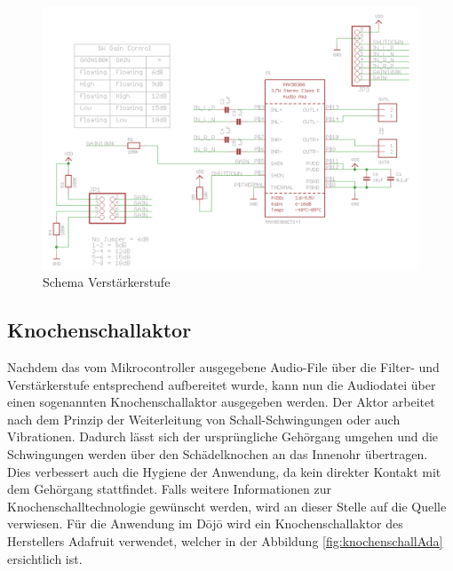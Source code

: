 \begin{figure}[H]
	\begin{center}
		\includegraphics[width=120mm]{data/Schema_Verstaerkerstufe.png}
		\caption{Schema Verstärkerstufe \cite{Verstaerker_Schema}} %
		\label{fig:Verstärkerstufe}
	\end{center}
\end{figure}


\subsection{Knochenschallaktor} \label{sec:knochenschallaktor}
Nachdem das vom Mikrocontroller ausgegebene Audio-File über die Filter- und Verstärkerstufe entsprechend aufbereitet wurde, kann nun die Audiodatei über einen sogenannten Knochenschallaktor ausgegeben werden. Der Aktor arbeitet nach dem Prinzip der Weiterleitung von Schall-Schwingungen oder auch Vibrationen. Dadurch lässt sich der ursprüngliche Gehörgang umgehen und die Schwingungen werden über den Schädelknochen an das Innenohr übertragen. Dies verbessert auch die Hygiene der Anwendung, da kein direkter Kontakt mit dem Gehörgang stattfindet\cite{Knochenschall}. Falls weitere Informationen zur Knochenschalltechnologie gewünscht werden, wird an dieser Stelle auf die Quelle \cite{Knochenschall_HDM_Stuttgart} verwiesen. Für die Anwendung im Dōjō wird ein Knochenschallaktor des Herstellers Adafruit verwendet, welcher in der Abbildung \ref{fig:knochenschallAda} ersichtlich ist.

